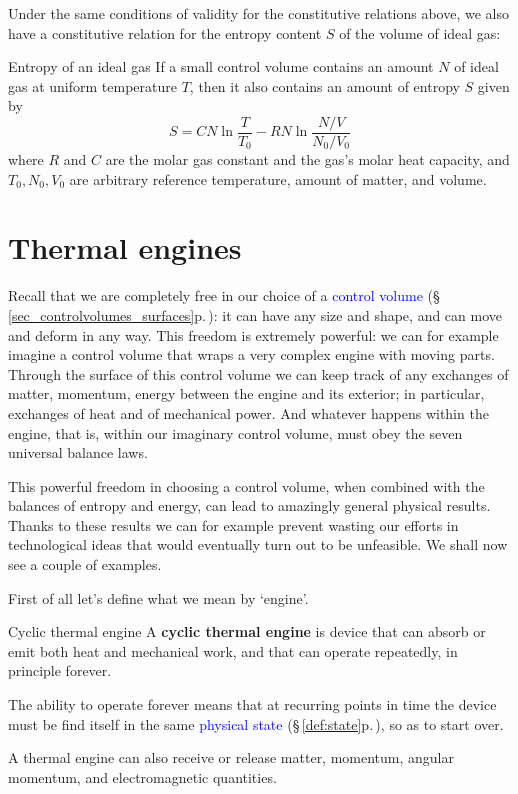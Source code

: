\documentclass[a4paper,12pt,%
onecolumn,oneside,%
british%
]{memoir}
\renewcommand*{\|}[1][]{\nonscript\:#1\vert\nonscript\:\mathopen{}}
\newcommand*{\sect}{\S}%
\renewcommand*{\autoref}[3][\sect\,\ref]{\textcolor{blue}{#3} {\color{blue}\scriptsize(\faIcon[regular]{eye}\;#1{#2}\;p.\,\pageref{#2})}}
\newcommand*{\yN}{N}
\newcommand*{\yS}{S}
\newcommand*{\yT}{T}%
\begin{document}
Under the same conditions of validity for the constitutive relations above, we also have a constitutive relation for the entropy content $\yS$ of the volume of ideal gas:
\begin{definition}{Entropy of an ideal gas}
  If a small control volume contains an amount $\yN$ of ideal gas at uniform temperature $\yT$, then it also contains an amount of entropy $\yS$ given by
  \begin{equation}
    \label{eq:entropy_idealgas}
    \yS = C \yN \ln\frac{\yT}{\yT_{0}} - R \yN \ln\frac{\yN/V}{\yN_{0}/V_{0}}
  \end{equation}
  where $R$ and $C$ are the molar gas constant and the gas's molar heat capacity, and $\yT_{0}, \yN_{0}, V_{0}$ are arbitrary reference temperature, amount of matter, and volume.
\end{definition}


\section{Thermal engines}
\label{sec:heat_engine}

Recall that we are completely free in our choice of a \autoref{sec_controlvolumes_surfaces}{control volume}: it can have any size and shape, and can move and deform in any way. This freedom is extremely powerful: we can for example imagine a control volume that wraps a very complex engine with moving parts. Through the surface of this control volume we can keep track of any exchanges of matter, momentum, energy between the engine and its exterior; in particular, exchanges of heat and of mechanical power. And whatever happens within the engine, that is, within our imaginary control volume, must obey the seven universal balance laws.

This powerful freedom in choosing a control volume, when combined with the balances of entropy and energy, can lead to amazingly general physical results. Thanks to these results we can for example prevent wasting our efforts in technological ideas that would eventually turn out to be unfeasible. We shall now see a couple of examples.

\medskip

First of all let's define what we mean by \enquote*{engine}.

\begin{definition}{Cyclic thermal engine}\label{def:thermal_engine}
  A \textbf{cyclic thermal engine} is device that can absorb or emit both heat and mechanical work, and that can operate repeatedly, in principle forever.

  \smallskip

  The ability to operate forever means that at recurring points in time the device must be find itself in the same \autoref{def:state}{physical state}, so as to start over.

  \smallskip

  A thermal engine can also receive or release matter, momentum, angular momentum, and electromagnetic quantities.
\end{definition}
\end{document}
